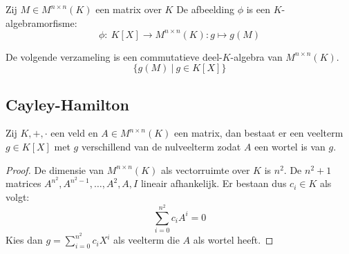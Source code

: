 \documentclass[main.tex]{subfiles}
\begin{document}
\begin{st}
  Zij $M\in M^{n\times n}(K)$ een matrix over $K$ De afbeelding $\phi$ is een $K$-algebramorfisme:
  \[ \phi:\ K[X] \rightarrow M^{n\times n}(K): g \mapsto g(M) \]
\end{st}

\begin{st}
  De volgende verzameling is een commutatieve deel-$K$-algebra van $M^{n\times n}(K)$.
  \[ \{ g(M) \ |\ g \in K[X] \} \]
\end{st}

\subsection{Cayley-Hamilton}
\label{sec:cayley-hamilton-1}

\begin{ei}
  Zij $K,+,\cdot$ een veld en $A\in M^{n\times n}(K)$ een matrix, dan bestaat er een veelterm $g\in K[X]$ met $g$ verschillend van de nulveelterm zodat $A$ een wortel is van $g$.

  \begin{proof}
    De dimensie van $M^{n \times n}(K)$ als vectorruimte over $K$ is $n^{2}$.\waarom
    De $n^{2}+1$ matrices $A^{n^{2}},A^{n^{2}-1},\dotsc,A^{2},A,I$ lineair afhankelijk.\waarom
    Er bestaan dus $c_{i}\in K$ als volgt:
    \[ \sum_{i=0}^{n^{2}}c_{i}A^{i} = 0 \]
    Kies dan $g= \sum_{i=0}^{n^{2}}c_{i}X^{i}$ als veelterm die $A$ als wortel heeft.
  \end{proof}
\end{ei}
\end{document}
